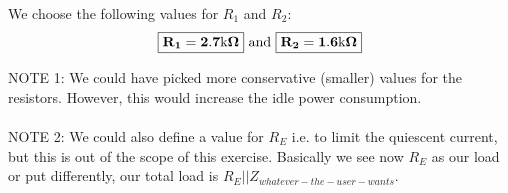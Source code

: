 \documentclass[../main.tex]{subfiles}
\begin{document}
	We choose the following values for $R_1$ and $R_2$:
	\[\boxed{\mathbf{R_1 = 2.7\text{k}\Omega}}~\text{and}~\boxed{\mathbf{R_2 = 1.6\text{k}\Omega}}\]
	
	NOTE 1: We could have picked more conservative (smaller) values for the resistors. However, this would increase the idle power consumption.\\\\
	NOTE 2: We could also define a value for $R_E$ i.e. to limit the quiescent current, but this is out of the scope of this exercise. Basically we see now $R_E$ as our load or put differently, our total load is $R_E||Z_{whatever-the-user-wants}$.
	
\end{document}
